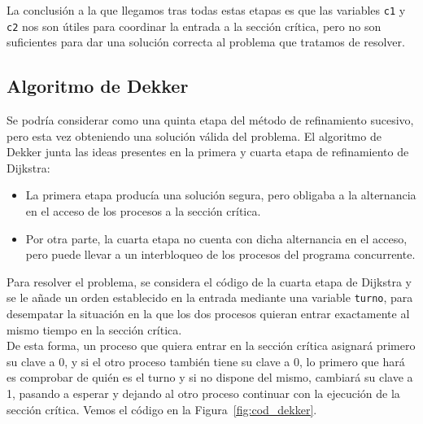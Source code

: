 La conclusión a la que llegamos tras todas estas etapas es que las variables \verb|c1| y \verb|c2| nos son útiles para coordinar la entrada a la sección crítica, pero no son suficientes para dar una solución correcta al problema que tratamos de resolver.\\

\subsection{Algoritmo de Dekker}
Se podría considerar como una quinta etapa del método de refinamiento sucesivo, pero esta vez obteniendo una solución válida del problema. El algoritmo de Dekker junta las ideas presentes en la primera y cuarta etapa de refinamiento de Dijkstra:
\begin{itemize}
    \item La primera etapa producía una solución segura, pero obligaba a la alternancia en el acceso de los procesos a la sección crítica.
    \item Por otra parte, la cuarta etapa no cuenta con dicha alternancia en el acceso, pero puede llevar a un interbloqueo de los procesos del programa concurrente.
\end{itemize}
Para resolver el problema, se considera el código de la cuarta etapa de Dijkstra y se le añade un orden establecido en la entrada mediante una variable \verb|turno|, para desempatar la situación en la que los dos procesos quieran entrar exactamente al mismo tiempo en la sección crítica.\\

De esta forma, un proceso que quiera entrar en la sección crítica asignará primero su clave a 0, y si el otro proceso también tiene su clave a 0, lo primero que hará es comprobar de quién es el turno y si no dispone del mismo, cambiará su clave a 1, pasando a esperar y dejando al otro proceso continuar con la ejecución de la sección crítica. Vemos el código en la Figura~\ref{fig:cod_dekker}.

